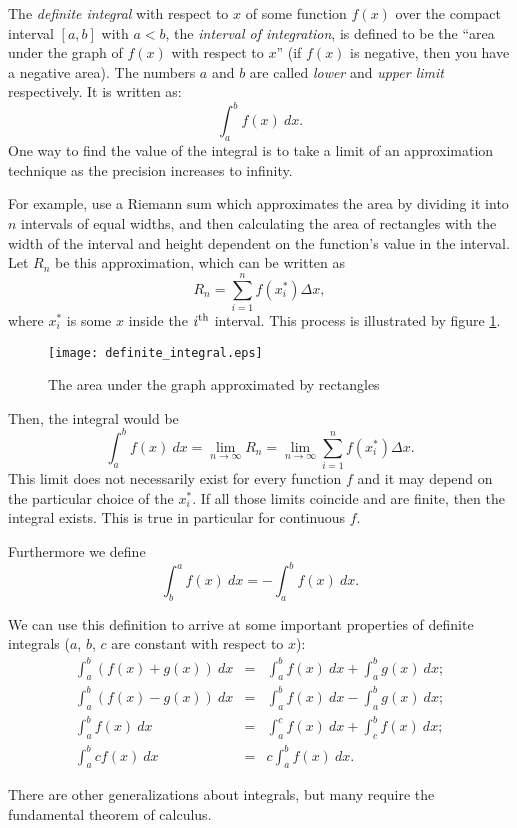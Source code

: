 \documentclass{article}
\begin{document}
The \emph{definite integral} with respect to $x$ of some function $f(x)$ over the compact interval $[a,b]$ with $a<b$, the \emph{interval of integration}, is
defined to be the ``area under the graph of $f(x)$ with respect to $x$'' (if $f(x)$ is negative, then you have a negative area). The numbers $a$ and $b$ are called \emph{lower} and \emph{upper limit} respectively. It is written as:
$$ \int_a^bf(x) \ dx .$$
One way to find the value of the integral is to take a limit of an approximation technique
as the precision increases to infinity.

For example, use a Riemann sum which approximates
the area by dividing it into $n$ intervals of equal widths, and then calculating the area
of rectangles with the width of the interval and height dependent on the function's value in the interval.
Let $R_n$ be this approximation, which can be written as
$$ R_n = \sum_{i=1}^{n} f(x_i^*) \Delta x ,$$
where $x_i^*$ is some $x$ inside the $i^{\rm th}$ interval. This process is illustrated by figure \ref{fig:bars}.
\begin{figure}[htbp]
\begin{centering}
\texttt{[image: definite\_integral.eps]}
\caption{The area under the graph approximated by rectangles}\label{fig:bars}
\end{centering}
\end{figure}

Then, the integral would be
$$ \int_a^bf(x) \ dx = \lim_{n \to \infty} R_n =
   \lim_{n \to \infty} \sum_{i=1}^{n} f(x_i^*) \Delta x .$$
This limit does not necessarily exist for every function $f$ and it may depend on the particular choice of the $x_i^*$.  If all those limits coincide and are finite, then the integral exists. This is true in particular for continuous $f$.

Furthermore we define
$$\int_b^af(x)\ dx=-\int_a^bf(x)\ dx.$$

We can use this definition to arrive at some important properties of definite integrals
($a$, $b$, $c$ are constant with respect to $x$):
\begin{eqnarray*}
\int_a^b(f(x) + g(x)) \ dx & = & \int_a^bf(x)\ dx + \int_a^bg(x)\ dx; \\
\int_a^b(f(x) - g(x)) \ dx & = & \int_a^bf(x)\ dx - \int_a^bg(x)\ dx ;\\
\int_a^bf(x) \ dx & = & \int_a^cf(x)\ dx + \int_c^bf(x)\ dx ;\\
\int_a^bcf(x) \ dx & = & c\int_a^bf(x)\ dx.
\end{eqnarray*}

There are other generalizations about integrals, but many require the fundamental theorem of calculus.
\end{document}

